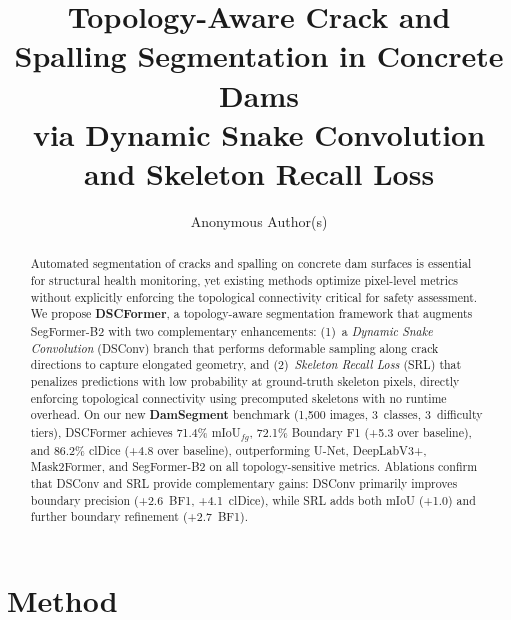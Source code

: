 \documentclass[10pt,twocolumn,letterpaper]{article}
\begin{document}
\title{Topology-Aware Crack and Spalling Segmentation in Concrete Dams\\via Dynamic Snake Convolution and Skeleton Recall Loss}

\author{
Anonymous Author(s)
}

\date{}
\maketitle

\begin{abstract}
Automated segmentation of cracks and spalling on concrete dam surfaces is essential for structural health monitoring, yet existing methods optimize pixel-level metrics without explicitly enforcing the topological connectivity critical for safety assessment.
We propose \textbf{DSCFormer}, a topology-aware segmentation framework that augments SegFormer-B2 with two complementary enhancements: (1)~a \emph{Dynamic Snake Convolution} (DSConv) branch that performs deformable sampling along crack directions to capture elongated geometry, and (2)~\emph{Skeleton Recall Loss} (SRL) that penalizes predictions with low probability at ground-truth skeleton pixels, directly enforcing topological connectivity using precomputed skeletons with no runtime overhead.
On our new \textbf{DamSegment} benchmark (1,500 images, 3~classes, 3~difficulty tiers), DSCFormer achieves 71.4\% mIoU$_{fg}$, 72.1\% Boundary F1 (+5.3 over baseline), and 86.2\% clDice (+4.8 over baseline), outperforming U-Net, DeepLabV3+, Mask2Former, and SegFormer-B2 on all topology-sensitive metrics.
Ablations confirm that DSConv and SRL provide complementary gains: DSConv primarily improves boundary precision (+2.6~BF1, +4.1~clDice), while SRL adds both mIoU (+1.0) and further boundary refinement (+2.7~BF1).
\end{abstract}



\section{Method}
\label{sec:method}
\end{document}
